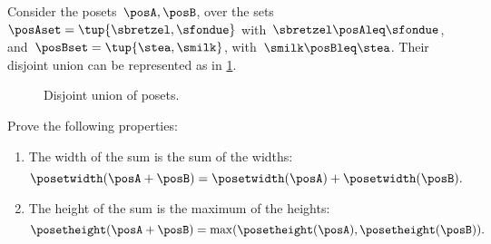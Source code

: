\begin{example}
    Consider the posets~$\posA,\posB$, over the sets~$\posAset=\tup{\sbretzel, \sfondue}$ with~$\sbretzel \posAleq \sfondue$, and~$\posBset=\tup{\stea,\smilk}$, with~$\smilk \posBleq \stea$.
    Their disjoint union can be represented as in \cref{fig:poset-coproduct}.
    \begin{figure}[h!]
        \centering
        \caption{Disjoint union of posets.}
        \label{fig:poset-coproduct}
    \end{figure}
\end{example}
\vfill
\begin{gradedexercise}
    \label{ex:MeasurePosetSum}
    Prove the following properties:
    \begin{enumerate}
        \item The width of the sum is the sum of the widths:
              \begin{equation}
                  \posetwidth(\posA + \posB) = \posetwidth(\posA) + \posetwidth(\posB).
              \end{equation}
        \item The height of the sum is the maximum of the heights:
              \begin{equation}
                  \posetheight(\posA + \posB) = \max(\posetheight(\posA), \posetheight(\posB)).
              \end{equation}
    \end{enumerate}
\end{gradedexercise}
